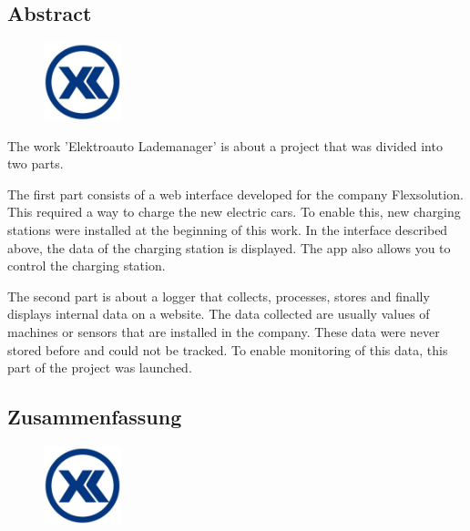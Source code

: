 \begin{spacing}{1}
    \chapter*{Abstract}
\end{spacing}
\begin{figure}
    \begin{center}
      \includegraphics[width=0.2\textwidth]{pics/Firmenlogo.jpeg}
    \end{center}
\end{figure}
The work 'Elektroauto Lademanager' is about a project that was divided into two parts.

The first part consists of a web interface developed for the company Flexsolution. This required a way to charge the new electric cars. To enable this, new charging stations were installed at the beginning of this work. In the interface described above, the data of the charging station is displayed. The app also allows you to control the charging station.

The second part is about a logger that collects, processes, stores and finally displays internal data on a website. The data collected are usually values of machines or sensors that are installed in the company. These data were never stored before and could not be tracked. To enable monitoring of this data, this part of the project was launched.
\newpage
\begin{spacing}{1}
    \chapter*{Zusammenfassung}
\end{spacing}
\begin{figure}
    \begin{center}
      \includegraphics[width=0.2\textwidth]{pics/Firmenlogo.jpeg}
    \end{center}
\end{figure}

